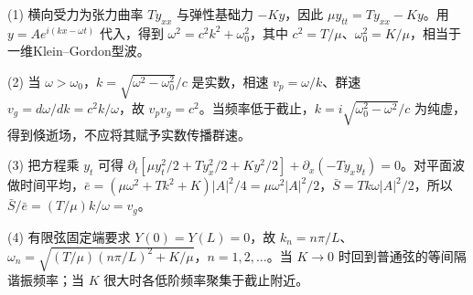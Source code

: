 (1) 横向受力为张力曲率 \(Ty_{xx}\) 与弹性基础力 \(-Ky\)，因此 \(\mu y_{tt}=Ty_{xx}-Ky\)。用 \(y=Ae^{i(kx-\omega t)}\) 代入，得到 \(\boxed{\omega^2=c^2k^2+\omega_0^2}\)，其中 \(c^2=T/\mu\)、\(\omega_0^2=K/\mu\)，相当于一维Klein–Gordon型波。

(2) 当 \(\omega>\omega_0\)，\(k=\sqrt{\omega^2-\omega_0^2}/c\) 是实数，相速 \(v_p=\omega/k\)、群速 \(v_g=d\omega/dk=c^2k/\omega\)，故 \(v_pv_g=c^2\)。当频率低于截止，\(k=i\sqrt{\omega_0^2-\omega^2}/c\) 为纯虚，得到倏逝场，不应将其赋予实数传播群速。

(3) 把方程乘 \(y_t\) 可得 \(\partial_t[\mu y_t^2/2+Ty_x^2/2+Ky^2/2]+\partial_x(-Ty_xy_t)=0\)。对平面波做时间平均，\(\bar e=(\mu\omega^2+Tk^2+K)|A|^2/4=\mu\omega^2|A|^2/2\)，\(\bar S=Tk\omega|A|^2/2\)，所以 \(\bar S/\bar e=(T/\mu)k/\omega=v_g\)。

(4) 有限弦固定端要求 \(Y(0)=Y(L)=0\)，故 \(k_n=n\pi/L\)、\(\boxed{\omega_n=\sqrt{(T/\mu)(n\pi/L)^2+K/\mu}}\)，\(n=1,2,\dots\)。当 \(K\to0\) 时回到普通弦的等间隔谐振频率；当 \(K\) 很大时各低阶频率聚集于截止附近。
